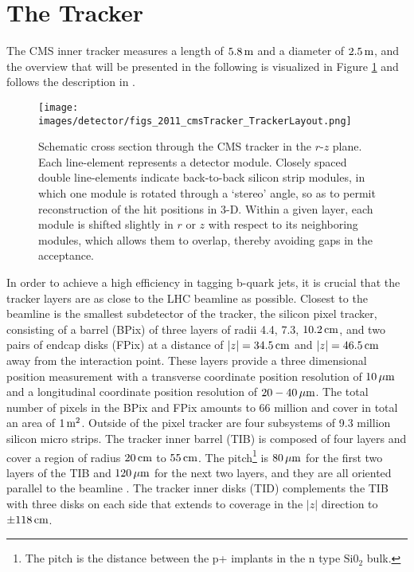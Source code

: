 \section{The Tracker}\label{sec:tracker}
\noindent\justify
The CMS inner tracker measures a length of $5.8\,\text{m}$ and a diameter of $2.5\,\text{m}$, and the overview that will be presented in the following is visualized in Figure \ref{fig:tracker} and follows the description in \cite{Chatrchyan:2014fea}. 
\begin{figure}[!htp]
  \centering
   \texttt{[image: images/detector/figs\_2011\_cmsTracker\_TrackerLayout.png]}
   \caption{Schematic cross section through the CMS tracker in the $r$-$z$ plane. Each line-element represents a detector module. Closely spaced double line-elements indicate back-to-back silicon strip modules, in which one module is rotated through a `stereo' angle, so as to permit reconstruction of the hit positions in 3-D. Within a given layer, each module is shifted slightly in $r$ or $z$ with respect to its neighboring modules, which allows them to overlap, thereby avoiding gaps in the acceptance. \cite{Chatrchyan:2014fea}}
   \label{fig:tracker}
\end{figure}                                                                                            
In order to achieve a high efficiency in tagging b-quark jets, it is crucial that the tracker layers are as close to the LHC beamline as possible. 
Closest to the beamline is the smallest subdetector of the tracker, the silicon pixel tracker, consisting of a barrel (BPix) of three layers of radii 4.4, 7.3, $10.2\,\text{cm}$, and two pairs of endcap disks (FPix) at a distance of $|z|=34.5\,\text{cm}$ and $|z|=46.5\,\text{cm}$ away from the interaction point. 
These layers provide a three dimensional position measurement with a transverse coordinate position resolution of $10\,\mu\text{m}$ and a longitudinal coordinate position resolution of $20-40\,\mu\text{m}$.
The total number of pixels in the BPix and FPix amounts to 66 million and cover in total an area of $1\,\text{m}^{2}$. 
Outside of the pixel tracker are four subsystems of 9.3 million silicon micro strips. 
\newpara
\noindent\justify
The tracker inner barrel (TIB) is composed of four layers and cover a region of radius $20\,\text{cm}$ to $55\,\text{cm}$. 
The pitch\footnote{The pitch is the distance between the p+ implants in the n type $\mathrm{Si0_{2}}$ bulk.} is $80\,\mu\text{m}$ for the first two layers of the TIB and $120\,\mu\text{m}$ for the next two layers, and they are all oriented parallel to the beamline \cite{DAlfonso:2009vko}.
The tracker inner disks (TID) complements the TIB with three disks on each side that extends to coverage in the $|z|$ direction to $\pm118\,\text{cm}$. 
